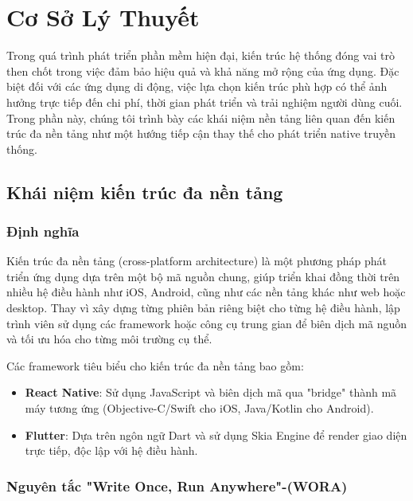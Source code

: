 \section{Cơ Sở Lý Thuyết }

  Trong quá trình phát triển phần mềm hiện đại, kiến trúc hệ thống đóng vai trò then chốt trong việc đảm bảo hiệu quả và khả năng mở rộng của ứng dụng. Đặc biệt đối với các ứng dụng di động, việc lựa chọn kiến trúc phù hợp có thể ảnh hưởng trực tiếp đến chi phí, thời gian phát triển và trải nghiệm người dùng cuối. Trong phần này, chúng tôi trình bày các khái niệm nền tảng liên quan đến kiến trúc đa nền tảng như một hướng tiếp cận thay thế cho phát triển native truyền thống.
\subsection{Khái niệm kiến trúc đa nền tảng}
\renewcommand{\labelitemi}{--}

\subsubsection{Định nghĩa}

    Kiến trúc đa nền tảng (cross-platform architecture) là một phương pháp phát triển ứng dụng dựa trên một bộ mã nguồn chung, giúp triển khai đồng thời trên nhiều hệ điều hành như iOS, Android, cũng như các nền tảng khác như web hoặc desktop. Thay vì xây dựng từng phiên bản riêng biệt cho từng hệ điều hành, lập trình viên sử dụng các framework hoặc công cụ trung gian để biên dịch mã nguồn và tối ưu hóa cho từng môi trường cụ thể.
\vspace{0.5em}


    Các framework tiêu biểu cho kiến trúc đa nền tảng bao gồm:
    \setlength{\leftmargini}{1.5cm}
    \begin{itemize}
        \item \textbf{React Native}: Sử dụng JavaScript và biên dịch mã qua "bridge" thành mã máy tương ứng (Objective-C/Swift cho iOS, Java/Kotlin cho Android).
        \item \textbf{Flutter}: Dựa trên ngôn ngữ Dart và sử dụng Skia Engine để render giao diện trực tiếp, độc lập với hệ điều hành.
    \end{itemize}

\subsubsection{Nguyên tắc "Write Once, Run Anywhere"-(WORA)}


